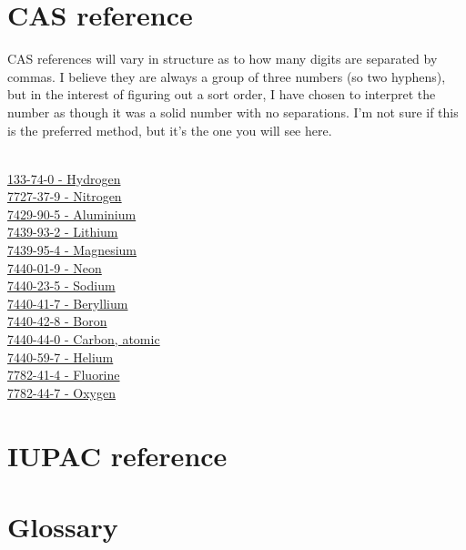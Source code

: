 \documentclass{book}
\begin{document}
\chapter{CAS reference}
CAS references will vary in structure as to how many digits are separated by commas.  I believe they are always a group of three numbers (so two hyphens), but in the interest of figuring out a sort order, I have chosen to interpret the number as though it was a solid number with no separations.  I'm not sure if this is the preferred method, but it's the one you will see here.\\
\\
\begin{multicols}{2}
\noindent
\hyperref[sec:elem-hydrogen]{133-74-0 - Hydrogen}\\
\hyperref[sec:elem-nitrogen]{7727-37-9 - Nitrogen}\\
\hyperref[sec:elem-aluminium]{7429-90-5 - Aluminium}\\
\hyperref[sec:elem-lithium]{7439-93-2 - Lithium}\\
\hyperref[sec:elem-magnesium]{7439-95-4 - Magnesium}\\
\hyperref[sec:elem-neon]{7440-01-9 - Neon}\\
\hyperref[sec:elem-sodium]{7440-23-5 - Sodium}\\
\hyperref[sec:elem-beryllium]{7440-41-7 - Beryllium}\\
\hyperref[sec:elem-boron]{7440-42-8 - Boron}\\
\hyperref[sec:elem-carbon]{7440-44-0 - Carbon, atomic}\\
\hyperref[sec:elem-helium]{7440-59-7 - Helium}\\
\hyperref[sec:elem-fluorine]{7782-41-4 - Fluorine}\\
\hyperref[sec:elem-oxygen]{7782-44-7 - Oxygen}\\
\end{multicols}

\chapter{IUPAC reference}

\chapter{Glossary}
\end{document}
